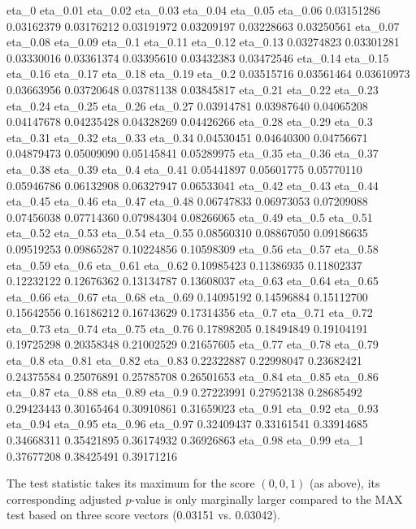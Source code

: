 \documentclass[bimj,fleqn]{w-art}
\begin{document}
\begin{Schunk}
\begin{Soutput}
     eta_0   eta_0.01   eta_0.02   eta_0.03   eta_0.04   eta_0.05   eta_0.06 
0.03151286 0.03162379 0.03176212 0.03191972 0.03209197 0.03228663 0.03250561 
  eta_0.07   eta_0.08   eta_0.09    eta_0.1   eta_0.11   eta_0.12   eta_0.13 
0.03274823 0.03301281 0.03330016 0.03361374 0.03395610 0.03432383 0.03472546 
  eta_0.14   eta_0.15   eta_0.16   eta_0.17   eta_0.18   eta_0.19    eta_0.2 
0.03515716 0.03561464 0.03610973 0.03663956 0.03720648 0.03781138 0.03845817 
  eta_0.21   eta_0.22   eta_0.23   eta_0.24   eta_0.25   eta_0.26   eta_0.27 
0.03914781 0.03987640 0.04065208 0.04147678 0.04235428 0.04328269 0.04426266 
  eta_0.28   eta_0.29    eta_0.3   eta_0.31   eta_0.32   eta_0.33   eta_0.34 
0.04530451 0.04640300 0.04756671 0.04879473 0.05009090 0.05145841 0.05289975 
  eta_0.35   eta_0.36   eta_0.37   eta_0.38   eta_0.39    eta_0.4   eta_0.41 
0.05441897 0.05601775 0.05770110 0.05946786 0.06132908 0.06327947 0.06533041 
  eta_0.42   eta_0.43   eta_0.44   eta_0.45   eta_0.46   eta_0.47   eta_0.48 
0.06747833 0.06973053 0.07209088 0.07456038 0.07714360 0.07984304 0.08266065 
  eta_0.49    eta_0.5   eta_0.51   eta_0.52   eta_0.53   eta_0.54   eta_0.55 
0.08560310 0.08867050 0.09186635 0.09519253 0.09865287 0.10224856 0.10598309 
  eta_0.56   eta_0.57   eta_0.58   eta_0.59    eta_0.6   eta_0.61   eta_0.62 
0.10985423 0.11386935 0.11802337 0.12232122 0.12676362 0.13134787 0.13608037 
  eta_0.63   eta_0.64   eta_0.65   eta_0.66   eta_0.67   eta_0.68   eta_0.69 
0.14095192 0.14596884 0.15112700 0.15642556 0.16186212 0.16743629 0.17314356 
   eta_0.7   eta_0.71   eta_0.72   eta_0.73   eta_0.74   eta_0.75   eta_0.76 
0.17898205 0.18494849 0.19104191 0.19725298 0.20358348 0.21002529 0.21657605 
  eta_0.77   eta_0.78   eta_0.79    eta_0.8   eta_0.81   eta_0.82   eta_0.83 
0.22322887 0.22998047 0.23682421 0.24375584 0.25076891 0.25785708 0.26501653 
  eta_0.84   eta_0.85   eta_0.86   eta_0.87   eta_0.88   eta_0.89    eta_0.9 
0.27223991 0.27952138 0.28685492 0.29423443 0.30165464 0.30910861 0.31659023 
  eta_0.91   eta_0.92   eta_0.93   eta_0.94   eta_0.95   eta_0.96   eta_0.97 
0.32409437 0.33161541 0.33914685 0.34668311 0.35421895 0.36174932 0.36926863 
  eta_0.98   eta_0.99      eta_1 
0.37677208 0.38425491 0.39171216 
\end{Soutput}
\end{Schunk}
The test statistic takes its maximum for the score $(0, 0, 1)$ 
(as above), its corresponding adjusted $p$-value is only marginally larger compared
to the MAX test based on three score vectors (0.03151
vs. 0.03042).
\end{document}
